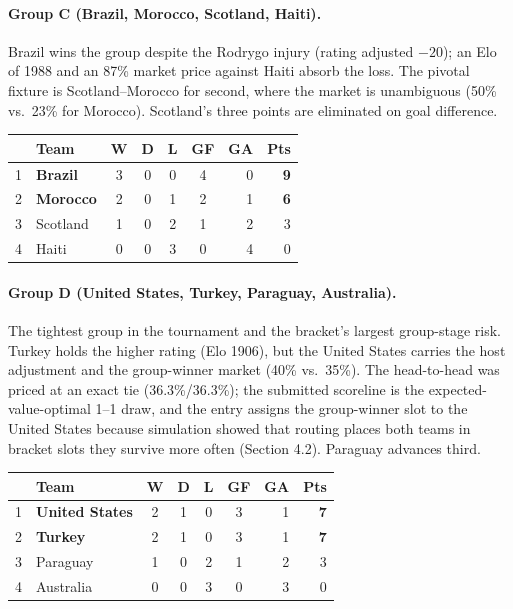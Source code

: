 \documentclass[11pt,letterpaper]{article}
\begin{document}
\paragraph{Group C (Brazil, Morocco, Scotland, Haiti).} Brazil wins the group despite the Rodrygo injury (rating adjusted $-20$); an Elo of 1988 and an 87\% market price against Haiti absorb the loss. The pivotal fixture is Scotland--Morocco for second, where the market is unambiguous (50\% vs.\ 23\% for Morocco). Scotland's three points are eliminated on goal difference.
\smallskip{}\\[1pt]
{\footnotesize
\begin{tabular}{@{}clccccrr@{}}
\toprule
 & Team & W & D & L & GF & GA & Pts \\
\midrule
1 & \textbf{Brazil} & 3 & 0 & 0 & 4 & 0 & \textbf{9} \\
2 & \textbf{Morocco} & 2 & 0 & 1 & 2 & 1 & \textbf{6} \\
3 & Scotland & 1 & 0 & 2 & 1 & 2 & 3 \\
4 & Haiti & 0 & 0 & 3 & 0 & 4 & 0 \\
\bottomrule
\end{tabular}}\smallskip

\paragraph{Group D (United States, Turkey, Paraguay, Australia).} The tightest group in the tournament and the bracket's largest group-stage risk. Turkey holds the higher rating (Elo 1906), but the United States carries the host adjustment and the group-winner market (40\% vs.\ 35\%). The head-to-head was priced at an exact tie (36.3\%/36.3\%); the submitted scoreline is the expected-value-optimal 1--1 draw, and the entry assigns the group-winner slot to the United States because simulation showed that routing places both teams in bracket slots they survive more often (Section 4.2). Paraguay advances third.
\smallskip{}\\[1pt]
{\footnotesize
\begin{tabular}{@{}clccccrr@{}}
\toprule
 & Team & W & D & L & GF & GA & Pts \\
\midrule
1 & \textbf{United States} & 2 & 1 & 0 & 3 & 1 & \textbf{7} \\
2 & \textbf{Turkey} & 2 & 1 & 0 & 3 & 1 & \textbf{7} \\
3 & Paraguay & 1 & 0 & 2 & 1 & 2 & 3 \\
4 & Australia & 0 & 0 & 3 & 0 & 3 & 0 \\
\bottomrule
\end{tabular}}\smallskip
\end{document}
